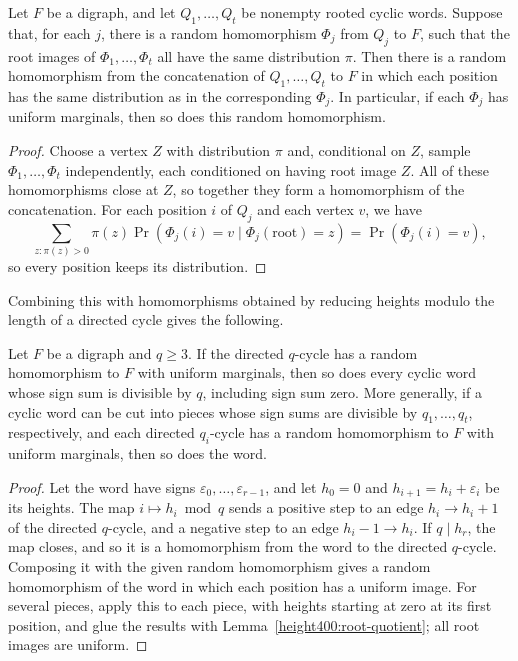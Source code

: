 \begin{lemma}
\label{height400:root-quotient}
Let $F$ be a digraph, and let $Q_1,\ldots,Q_t$ be nonempty rooted
cyclic words. Suppose that, for each $j$, there is a random homomorphism $\Phi_j$ from $Q_j$ to $F$, such that the root images of $\Phi_1,\ldots,\Phi_t$ all have the same distribution $\pi$.
Then there is a random homomorphism from the concatenation of $Q_1,\ldots,Q_t$ to $F$ in which each position has the same distribution as in the corresponding $\Phi_j$.
In particular, if each $\Phi_j$ has uniform marginals, then so does this random homomorphism.
\end{lemma}
\begin{proof}
Choose a vertex $Z$ with distribution $\pi$ and, conditional on $Z$, sample $\Phi_1,\ldots,\Phi_t$ independently, each conditioned on having root image $Z$. All of these homomorphisms close at $Z$, so together they form a homomorphism of the concatenation. For each position
$i$ of $Q_j$ and each vertex $v$, we have
\[
 \sum_{z:\pi(z)>0}\pi(z)
 \Pr(\Phi_j(i)=v\mid\Phi_j(\text{root})=z)=\Pr(\Phi_j(i)=v),
\]
so every position keeps its distribution.
\end{proof}

Combining this with homomorphisms obtained by reducing heights modulo the length of a directed cycle gives the following.

\begin{lemma}\label{height400:quotient}
Let $F$ be a digraph and $q\ge3$. If the directed $q$-cycle has a random homomorphism to $F$ with uniform
marginals, then so does every cyclic word whose sign
sum is divisible by $q$, including sign sum zero. More generally, if a cyclic word can be cut into pieces whose sign sums are divisible by
$q_1,\ldots,q_t$, respectively, and each directed $q_i$-cycle has a random homomorphism to $F$ with uniform marginals, then so does the word.
\end{lemma}
\begin{proof}
Let the word have signs $\varepsilon_0,\ldots,\varepsilon_{r-1}$, and let $h_0=0$ and
$h_{i+1}=h_i+\varepsilon_i$ be its heights. The map $i\mapsto h_i\bmod q$ sends a positive step to an edge
$h_i\to h_i+1$ of the directed $q$-cycle, and a negative step to an edge $h_i-1\to h_i$. If $q\mid h_r$, the map closes, and so it is a homomorphism from the word to the directed $q$-cycle. Composing it with the given random homomorphism gives a random homomorphism of the word in which each position has a uniform image.
For several pieces, apply this to each piece, with heights starting at zero at its first position, and glue the results with Lemma~\ref{height400:root-quotient}; all root images are uniform.
\end{proof}

